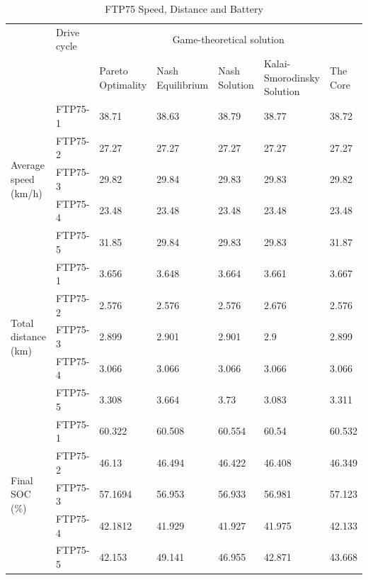 \begin{table}[h]
\centering
\begin{tabular}{ |p{1.5cm}|p{1.5cm}|p{1.3cm}|p{1.3cm}|p{1.3cm}|p{1.3cm}|p{1.3cm}|} 
 \hline
  \cline{3-7}
   & Drive cycle & \multicolumn{5}{|c|}{Game-theoretical solution} \\
   \cline{3-7}
   & & Pareto Optimality & Nash Equilibrium & Nash Solution & Kalai- Smorodinsky Solution & The Core\\
 \hline\hline
 \multirow{5}{*}{\parbox{1.5cm}{Average speed (km/h)}}
 & FTP75-1 & 38.71 & 38.63 & 38.79 & 38.77 & 38.72 \\
 & FTP75-2 & 27.27 & 27.27 & 27.27 & 27.27 & 27.27 \\ 
 & FTP75-3 & 29.82 & 29.84 & 29.83 & 29.83 & 29.82 \\ 
 & FTP75-4 & 23.48 & 23.48 & 23.48 & 23.48 & 23.48 \\ 
 & FTP75-5 & 31.85 & 29.84 & 29.83 & 29.83 & 31.87 \\ 
 \hline 
 \multirow{5}{*}{\parbox{1.5cm}{Total distance (km)}}
 & FTP75-1 & 3.656 & 3.648 & 3.664 & 3.661 & 3.667 \\ 
 & FTP75-2 & 2.576 & 2.576 & 2.576 & 2.676 & 2.576 \\ 
 & FTP75-3 & 2.899 & 2.901 & 2.901 & 2.9 & 2.899 \\ 
 & FTP75-4 & 3.066 & 3.066 & 3.066 & 3.066 & 3.066 \\ 
 & FTP75-5 & 3.308 & 3.664 & 3.73 & 3.083 & 3.311 \\ 
 \hline 
 \multirow{5}{*}{\parbox{1.5cm}{Final SOC (\%)}}
 & FTP75-1 & 60.322 & 60.508 & 60.554 & 60.54 & 60.532 \\ 
 & FTP75-2 & 46.13 & 46.494 & 46.422 & 46.408 & 46.349 \\ 
 & FTP75-3 & 57.1694 & 56.953 & 56.933 & 56.981 & 57.123 \\ 
 & FTP75-4 & 42.1812 & 41.929 & 41.927 & 41.975 & 42.133 \\ 
 & FTP75-5 & 42.153 & 49.141 & 46.955 & 42.871 & 43.668 \\ 
 \hline

 \hline
\end{tabular}
\caption{FTP75 Speed, Distance and Battery}
\label{tab:soc}
\end{table}

